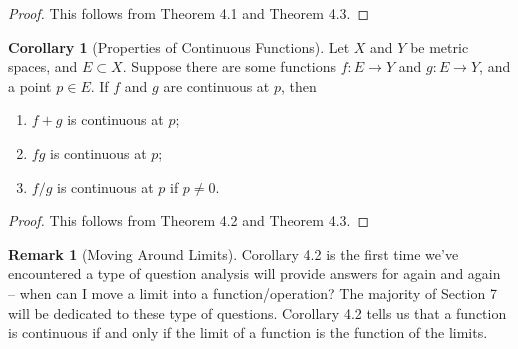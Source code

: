 \documentclass{article}
\theoremstyle{definition}
\newtheorem{corollary}{Corollary}[section]
\newtheorem{remark}{Remark}[section]
\begin{document}
\begin{proof}
This follows from Theorem 4.1 and Theorem 4.3. 
\end{proof}
\begin{corollary}[Properties of Continuous Functions] 
Let $ X $ and $ Y $ be metric spaces, and $ E\subset X $. Suppose there are some functions $ f:E\to Y $ and $ g:E\to Y $, and a point $ p \in E $. If $ f $ and $ g $ are continuous at $ p $, then 
\begin{enumerate}
	\item $ f+g $ is continuous at $ p $;
	\item $ fg $ is continuous at $ p $;
	\item $ f/g $ is continuous at $ p $ if $ p\neq0 $.
\end{enumerate}
\end{corollary}
\begin{proof}
	This follows from Theorem 4.2 and Theorem 4.3.
\end{proof}
\begin{remark}[Moving Around Limits]
Corollary 4.2 is the first time we've encountered a type of question analysis will provide answers for again and again -- when can I move a limit into a function/operation? The majority of Section 7 will be dedicated to these type of questions. Corollary 4.2 tells us that a function is continuous if and only if the limit of a function is the function of the limits.   
\end{remark}
\end{document}
